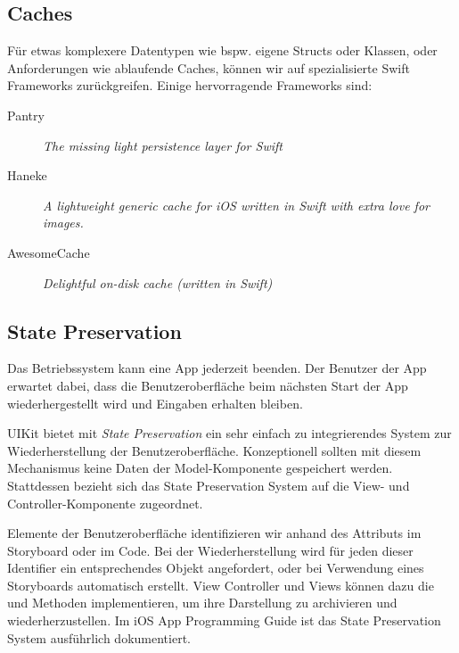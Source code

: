 \documentclass[parskip=half, final]{scrreprt}
\begin{document}
\begin{lecture}
\subsection{Caches}

Für etwas komplexere Datentypen wie bspw. eigene Structs oder Klassen, oder Anforderungen wie ablaufende Caches, können wir auf spezialisierte Swift Frameworks zurückgreifen. Einige hervorragende Frameworks sind:
\begin{description}
\item[Pantry] \emph{The missing light persistence layer for Swift}
\item[Haneke] \emph{A lightweight generic cache for iOS written in Swift with extra love for images.}
\item[AwesomeCache] \emph{Delightful on-disk cache (written in Swift)}
\end{description}

\subsection{State Preservation}

Das Betriebssystem kann eine App jederzeit beenden. Der Benutzer der App erwartet dabei, dass die Benutzeroberfläche beim nächsten Start der App wiederhergestellt wird und Eingaben erhalten bleiben.

UIKit bietet mit \emph{State Preservation} ein sehr einfach zu integrierendes System zur Wiederherstellung der Benutzeroberfläche. Konzeptionell sollten mit diesem Mechanismus keine Daten der Model-Komponente gespeichert werden. Stattdessen bezieht sich das State Preservation System auf die View- und Controller-Komponente zugeordnet.

Elemente der Benutzeroberfläche identifizieren wir anhand des  Attributs im Storyboard oder im Code. Bei der Wiederherstellung wird für jeden dieser Identifier ein entsprechendes Objekt angefordert, oder bei Verwendung eines Storyboards automatisch erstellt. View Controller und Views können dazu die  und  Methoden implementieren, um ihre Darstellung zu archivieren und wiederherzustellen. Im iOS App Programming Guide  ist das State Preservation System ausführlich dokumentiert.


\end{lecture}
\end{document}
